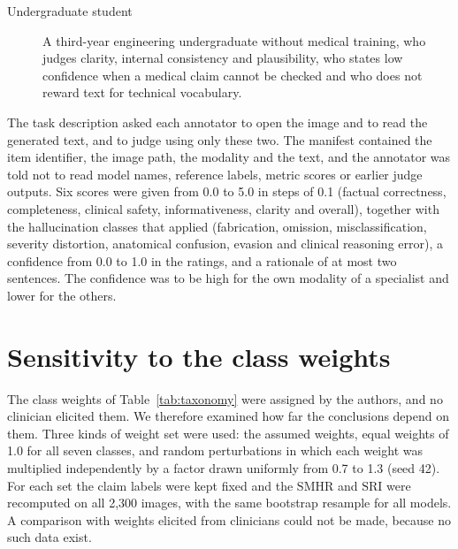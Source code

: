 \documentclass[11pt,a4paper]{article}
\newcommand{\SMHR}{\ensuremath{\mathrm{SMHR}}}
\newcommand{\SRI}{\ensuremath{\mathrm{SRI}}}
\begin{document}
\begin{appendices}
\begin{description}
  \item[Undergraduate student] A third-year engineering undergraduate without medical training, who judges clarity, internal consistency and plausibility, who states low confidence when a medical claim cannot be checked and who does not reward text for technical vocabulary.
\end{description}
The task description asked each annotator to open the image and to read the generated text, and to judge using only these two. The manifest contained the item identifier, the image path, the modality and the text, and the annotator was told not to read model names, reference labels, metric scores or earlier judge outputs. Six scores were given from 0.0 to 5.0 in steps of 0.1 (factual correctness, completeness, clinical safety, informativeness, clarity and overall), together with the hallucination classes that applied (fabrication, omission, misclassification, severity distortion, anatomical confusion, evasion and clinical reasoning error), a confidence from 0.0 to 1.0 in the ratings, and a rationale of at most two sentences. The confidence was to be high for the own modality of a specialist and lower for the others.

\section{Sensitivity to the class weights}\label{app:weights}

The class weights of Table~\ref{tab:taxonomy} were assigned by the authors, and no clinician elicited them. We therefore examined how far the conclusions depend on them. Three kinds of weight set were used: the assumed weights, equal weights of 1.0 for all seven classes, and random perturbations in which each weight was multiplied independently by a factor drawn uniformly from 0.7 to 1.3 (seed 42). For each set the claim labels were kept fixed and the \SMHR{} and \SRI{} were recomputed on all 2{,}300 images, with the same bootstrap resample for all models. A comparison with weights elicited from clinicians could not be made, because no such data exist.


\end{appendices}
\end{document}

